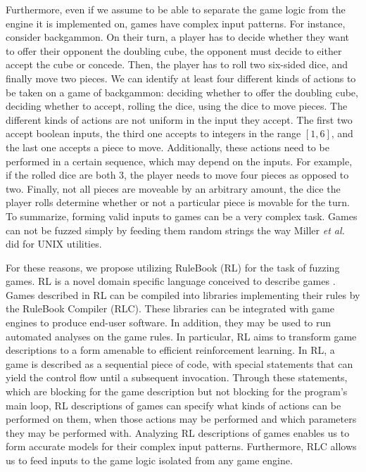 Furthermore, even if we assume to be able to separate the game logic from the engine it is implemented on, games have complex input patterns.
For instance, consider backgammon.
On their turn, a player has to decide whether they want to offer their opponent the doubling cube, the opponent must decide to either accept the cube or concede.
Then, the player has to roll two six-sided dice, and finally move two pieces.
We can identify at least four different kinds of actions to be taken on a game of backgammon: deciding whether to offer the doubling cube, deciding whether to accept, rolling the dice, using the dice to move pieces.
The different kinds of actions are not uniform in the input they accept.
The first two accept boolean inputs, the third one accepts to integers in the range $[1,6]$, and the last one accepts a piece to move.
Additionally, these actions need to be performed in a certain sequence, which may depend on the inputs.
For example, if the rolled dice are both 3, the player needs to move four pieces as opposed to two.
Finally, not all pieces are moveable by an arbitrary amount, the dice the player rolls determine whether or not a particular piece is movable for the turn.
To summarize, forming valid inputs to games can be a very complex task.
Games can not be fuzzed simply by feeding them random strings the way Miller \textit{et al.} did for UNIX utilities.

For these reasons, we propose utilizing RuleBook (RL) for the task of fuzzing games.
RL is a novel domain specific language conceived to describe games \cite{RLC}.
Games described in RL can be compiled into libraries implementing their rules by the RuleBook Compiler (RLC).
These libraries can be integrated with game engines to produce end-user software.
In addition, they may be used to run automated analyses on the game rules.
In particular, RL aims to transform game descriptions to a form amenable to efficient reinforcement learning.
In RL, a game is described as a sequential piece of code, with special statements that can yield the control flow until a subsequent invocation.
Through these statements, which are blocking for the game description but not blocking for the program's main loop, RL descriptions of games can specify what kinds of actions can be performed on them, when those actions may be performed and which parameters they may be performed with.
Analyzing RL descriptions of games enables us to form accurate models for their complex input patterns.
Furthermore, RLC allows us to feed inputs to the game logic isolated from any game engine.

